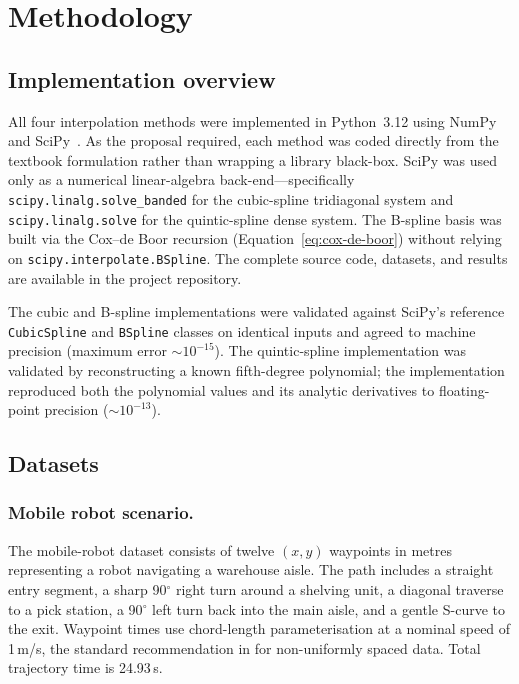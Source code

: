 \section{Methodology}
\label{sec:methodology}

\subsection{Implementation overview}
\label{sec:impl-overview}

All four interpolation methods were implemented in Python~3.12 using
NumPy~\cite{numpy} and SciPy~\cite{scipy}. As the proposal required,
each method was coded directly from the textbook formulation rather
than wrapping a library black-box. SciPy was used only as a numerical
linear-algebra back-end---specifically \texttt{scipy.linalg.solve\_banded}
for the cubic-spline tridiagonal system and \texttt{scipy.linalg.solve}
for the quintic-spline dense system. The B-spline basis was built via
the Cox--de Boor recursion (Equation~\ref{eq:cox-de-boor}) without
relying on \texttt{scipy.interpolate.BSpline}. The complete source
code, datasets, and results are available in the project repository.

The cubic and B-spline implementations were validated against
SciPy's reference \texttt{CubicSpline} and \texttt{BSpline} classes
on identical inputs and agreed to machine precision (maximum error
$\sim 10^{-15}$). The quintic-spline implementation was validated by
reconstructing a known fifth-degree polynomial; the implementation
reproduced both the polynomial values and its analytic derivatives
to floating-point precision ($\sim 10^{-13}$).

\subsection{Datasets}
\label{sec:datasets}

\subsubsection{Mobile robot scenario.}
The mobile-robot dataset consists of twelve $(x, y)$ waypoints in
metres representing a robot navigating a warehouse aisle. The path
includes a straight entry segment, a sharp 90$^{\circ}$ right turn
around a shelving unit, a diagonal traverse to a pick station, a
90$^{\circ}$ left turn back into the main aisle, and a gentle
S-curve to the exit. Waypoint times use chord-length parameterisation
at a nominal speed of 1\,m/s, the standard recommendation in
\cite[Section 24.1]{chapra2021} for non-uniformly spaced data. Total
trajectory time is 24.93\,s.

